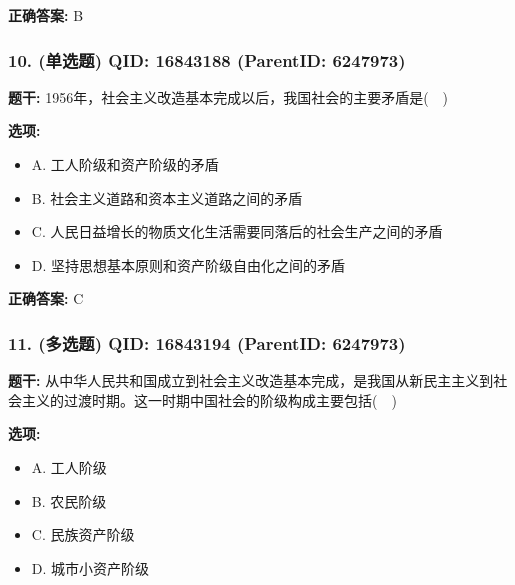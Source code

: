 \documentclass[12pt,UTF8]{ctexart}
\begin{document}
\textbf{正确答案:}
B

\vspace{0.3em}\hrulefill\vspace{0.7em}

\subsubsection*{10. (单选题) \small QID: 16843188 (ParentID: 6247973)}

\textbf{题干:}
1956年，社会主义改造基本完成以后，我国社会的主要矛盾是(  )



\textbf{选项:}
\begin{itemize}[leftmargin=*]

  \item A. 工人阶级和资产阶级的矛盾

  \item B. 社会主义道路和资本主义道路之间的矛盾

  \item C. 人民日益增长的物质文化生活需要同落后的社会生产之间的矛盾

  \item D. 坚持思想基本原则和资产阶级自由化之间的矛盾

\end{itemize}

\textbf{正确答案:}
C

\vspace{0.3em}\hrulefill\vspace{0.7em}

\subsubsection*{11. (多选题) \small QID: 16843194 (ParentID: 6247973)}

\textbf{题干:}
从中华人民共和国成立到社会主义改造基本完成，是我国从新民主主义到社会主义的过渡时期。这一时期中国社会的阶级构成主要包括(  )



\textbf{选项:}
\begin{itemize}[leftmargin=*]

  \item A. 工人阶级

  \item B. 农民阶级

  \item C. 民族资产阶级

  \item D. 城市小资产阶级

\end{itemize}
\end{document}
